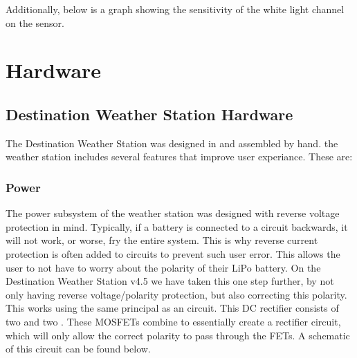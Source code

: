 \documentclass[letterpaper,10pt,english]{sphinxmanual}
\begin{document}

\sphinxAtStartPar
Additionally, below is a graph showing the sensitivity of the white light channel on the sensor.



\chapter{Hardware}
\label{\detokenize{index:hardware}}
\sphinxstepscope


\section{Destination Weather Station \sphinxhyphen{} Hardware}
\label{\detokenize{hardware/index:destination-weather-station-hardware}}\label{\detokenize{hardware/index:hardware}}\label{\detokenize{hardware/index::doc}}
\sphinxAtStartPar
The Destination Weather Station was designed in  and assembled by hand. the weather station includes several features that improve user experiance. These are:

\sphinxstepscope


\subsection{Power}
\label{\detokenize{hardware/power:power}}\label{\detokenize{hardware/power:id1}}\label{\detokenize{hardware/power::doc}}
\sphinxAtStartPar
The power subsystem of the weather station was designed with reverse voltage protection in mind. Typically, if a battery is connected to a circuit backwards, it will not work, or worse, fry the entire system. This is why reverse current protection is often added to circuits to prevent such user error. This allows the user to not have to worry about the polarity of their LiPo battery. On the Destination Weather Station v4.5 we have taken this one step further, by not only having reverse voltage/polarity protection, but also correcting this polarity. This works using the same principal as an  circuit. This DC rectifier consists of two  and two . These MOSFETs combine to essentially create a rectifier circuit, which will only allow the correct polarity to pass through the FETs. A schematic of this circuit can be found below.
\end{document}
